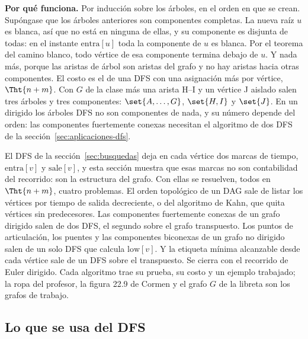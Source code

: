 \documentclass[11pt,letterpaper]{article}
\begin{document}
\textbf{Por qué funciona.} Por inducción sobre los árboles, en el
orden en que se crean. Supóngase que los árboles anteriores son
componentes completas. La nueva raíz $u$ es blanca, así que no está en
ninguna de ellas, y su componente es disjunta de todas: en el
instante $\text{entra}[u]$ toda la componente de $u$ es blanca. Por el
teorema del camino blanco, todo vértice de esa componente termina
debajo de $u$. Y nada más, porque las aristas de árbol son aristas del
grafo y no hay aristas hacia otras componentes. El costo es el de una
DFS con una asignación más por vértice, $\Tht{n + m}$. Con $G$ de la
clase más una arista H--I y un vértice J aislado salen tres árboles y
tres componentes: $\set{A, \dots, G}$, $\set{H, I}$ y $\set{J}$. En un
dirigido los árboles DFS no son componentes de nada, y su número
depende del orden: las componentes fuertemente conexas necesitan el
algoritmo de dos DFS de la sección~\ref{sec:aplicaciones-dfs}.

\newpage


\label{sec:aplicaciones-dfs}

\begin{quick_sum}
  El DFS de la sección~\ref{sec:busquedas} deja en cada vértice dos
  marcas de tiempo, $\text{entra}[v]$ y $\text{sale}[v]$, y esta
  sección muestra que esas marcas no son contabilidad del recorrido:
  son la estructura del grafo. Con ellas se resuelven, todos en
  $\Tht{n + m}$, cuatro problemas. El orden topológico de un DAG sale
  de listar los vértices por tiempo de salida decreciente, o del
  algoritmo de Kahn, que quita vértices sin predecesores. Las
  componentes fuertemente conexas de un grafo dirigido salen de dos
  DFS, el segundo sobre el grafo transpuesto. Los puntos de
  articulación, los puentes y las componentes biconexas de un grafo no
  dirigido salen de un solo DFS que calcula $\text{low}[v]$. Y la
  etiqueta mínima alcanzable desde cada vértice sale de un DFS sobre el
  transpuesto. Se cierra con el recorrido de Euler dirigido. Cada
  algoritmo trae su prueba, su costo y un ejemplo trabajado; la ropa
  del profesor, la figura 22.9 de Cormen y el grafo $G$ de la libreta
  son los grafos de trabajo.
\end{quick_sum}

\subsection*{Lo que se usa del DFS}
\end{document}
